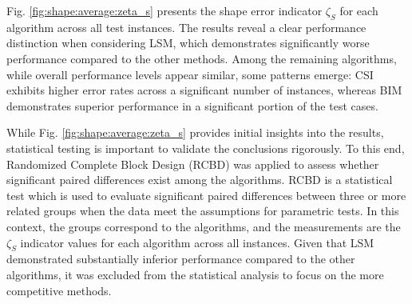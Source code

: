 \documentclass{IEEEtran}
\begin{document}
                Fig. \ref{fig:shape:average:zeta_s} presents the shape error indicator $\zeta_S$ for each algorithm across all test instances. The results reveal a clear performance distinction when considering LSM, which demonstrates significantly worse performance compared to the other methods. Among the remaining algorithms, while overall performance levels appear similar, some patterns emerge: CSI exhibits higher error rates across a significant number of instances, whereas BIM demonstrates superior performance in a significant portion of the test cases.


                While Fig. \ref{fig:shape:average:zeta_s} provides initial insights into the results, statistical testing is important to validate the conclusions rigorously. To this end, Randomized Complete Block Design (RCBD) was applied to assess whether significant paired differences exist among the algorithms. RCBD is a statistical test which is used to evaluate significant paired differences between three or more related groups when the data meet the assumptions for parametric tests. In this context, the groups correspond to the algorithms, and the measurements are the $\zeta_S$ indicator values for each algorithm across all instances. Given that LSM demonstrated substantially inferior performance compared to the other algorithms, it was excluded from the statistical analysis to focus on the more competitive methods.

\end{document}

